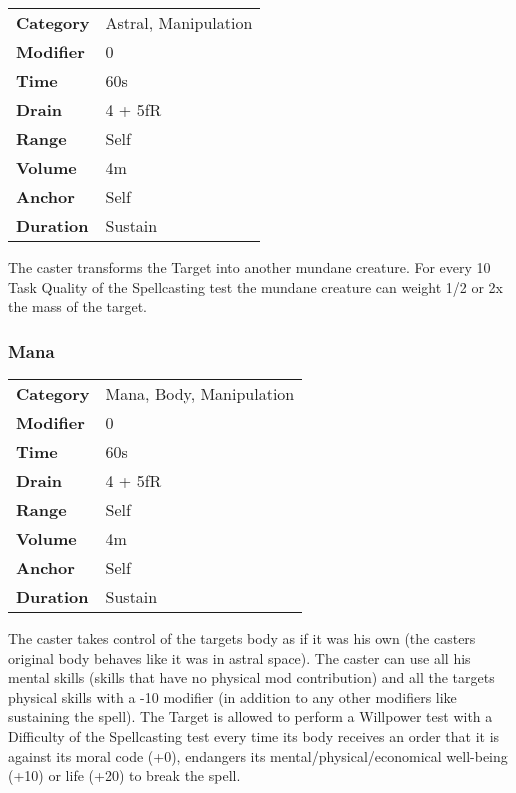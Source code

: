 
\begin{tabular}{ll}
    \textbf{Category} & Astral, Manipulation \\
    \textbf{Modifier} & 0                    \\
    \textbf{Time}     & 60s                  \\
    \textbf{Drain}    & 4 + 5fR              \\
    \textbf{Range}    & Self                 \\
    \textbf{Volume}   & 4m                   \\
    \textbf{Anchor}   & Self                 \\
    \textbf{Duration} & Sustain              \\
\end{tabular}

\hfil

The caster transforms the Target into another mundane creature.
For every 10 Task Quality of the
Spellcasting test the mundane creature can
weight 1/2 or 2x the mass of the target.

\subsubsection{Mana}


\begin{tabular}{ll}
    \textbf{Category} & Mana, Body, Manipulation \\
    \textbf{Modifier} & 0                        \\
    \textbf{Time}     & 60s                      \\
    \textbf{Drain}    & 4 + 5fR                  \\
    \textbf{Range}    & Self                     \\
    \textbf{Volume}   & 4m                       \\
    \textbf{Anchor}   & Self                     \\
    \textbf{Duration} & Sustain                  \\
\end{tabular}

\hfil

The caster takes control of the targets body as if it was his
own (the casters original body behaves like it was in astral space). The
caster can use all his mental skills (skills that have no physical mod
contribution) and all the targets physical skills with a -10 modifier
(in addition to any other modifiers like sustaining the spell). The
Target is allowed to perform a Willpower test with a Difficulty of the
Spellcasting test every time its body receives an order that it is
against its moral code (+0), endangers its mental/physical/economical
well-being (+10) or life (+20) to break the spell.



